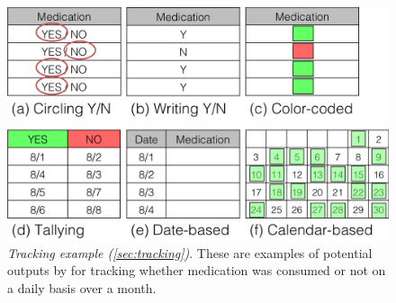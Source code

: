 \documentclass{sig-alternate}
\begin{document}
\begin{figure}
\centering
\includegraphics[width=\linewidth]{img/tracking.png}
\caption{\emph{Tracking example (\ref{sec:tracking})}. These are examples of potential outputs by \nifty for tracking whether medication was consumed or not on a daily basis over a month.}
\label{fig:tracking}
\end{figure}


\end{document}
